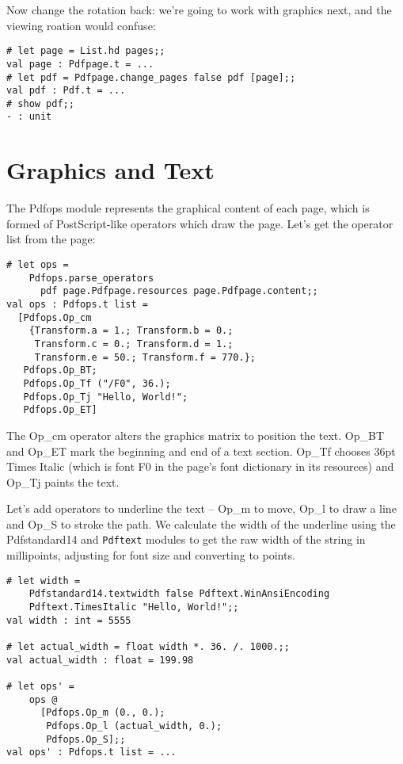\documentclass[a4paper]{memoir}
\begin{document}
\noindent Now change the rotation back: we're going to work with graphics next, and the viewing roation would confuse:
\begin{framed}
\small\begin{verbatim}
# let page = List.hd pages;;
val page : Pdfpage.t = ...
# let pdf = Pdfpage.change_pages false pdf [page];;
val pdf : Pdf.t = ...
# show pdf;;
- : unit
\end{verbatim}
\end{framed}
\section*{Graphics and Text}
The \textsf{Pdfops} module represents the graphical content of each page, which is formed of PostScript-like operators which draw the page. Let's get the operator list from the page:
\begin{framed}
\small\begin{verbatim}
# let ops =
    Pdfops.parse_operators
      pdf page.Pdfpage.resources page.Pdfpage.content;;
val ops : Pdfops.t list =
  [Pdfops.Op_cm
    {Transform.a = 1.; Transform.b = 0.;
     Transform.c = 0.; Transform.d = 1.;
     Transform.e = 50.; Transform.f = 770.};
   Pdfops.Op_BT;
   Pdfops.Op_Tf ("/F0", 36.);
   Pdfops.Op_Tj "Hello, World!";
   Pdfops.Op_ET]
\end{verbatim}
\end{framed}
\noindent The \textsf{Op\_cm} operator alters the graphics matrix to position the text. \textsf{Op\_BT} and \textsf{Op\_ET} mark the beginning and end of a text section. \textsf{Op\_Tf} chooses 36pt Times Italic (which is font \textsf{F0} in the page's font dictionary in its resources) and \textsf{Op\_Tj} paints the text.

Let's add operators to underline the text -- \textsf{Op\_m} to move, \textsf{Op\_l} to draw a line and \textsf{Op\_S} to stroke the path. We calculate the width of the underline using the \textsf{Pdfstandard14} and \texttt{Pdftext} modules to get the raw width of the string in millipoints, adjusting for font size and converting to points.

\begin{framed}
\small\begin{verbatim}
# let width =
    Pdfstandard14.textwidth false Pdftext.WinAnsiEncoding
    Pdftext.TimesItalic "Hello, World!";;
val width : int = 5555

# let actual_width = float width *. 36. /. 1000.;;
val actual_width : float = 199.98

# let ops' =
    ops @
      [Pdfops.Op_m (0., 0.);
       Pdfops.Op_l (actual_width, 0.);
       Pdfops.Op_S];;
val ops' : Pdfops.t list = ...
\end{verbatim}
\end{framed}
\end{document}

